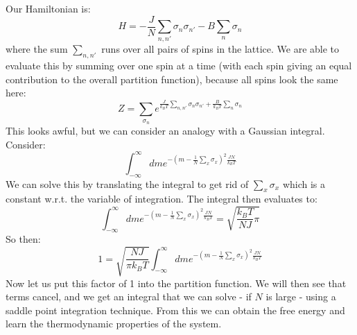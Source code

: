 Our Hamiltonian is:
\begin{equation}
    H = -\frac{J}{N}\sum_{n, n'}\sigma_n \sigma_{n'} - B\sum_n \sigma_n
\end{equation}
where the sum $\sum_{n, n'}$ runs over all pairs of spins in the lattice. We are able to evaluate this by summing over one spin at a time (with each spin giving an equal contribution to the overall partition function), because all spins look the same here:
\begin{equation}
    Z = \sum_{\sigma_n} e^{\frac{J}{k_B T}\sum_{n, n'}\sigma_n \sigma_{n'} + \frac{B}{k_B T}\sum_n \sigma_n}
\end{equation}
This looks awful, but we can consider an analogy with a Gaussian integral. Consider:
\begin{equation}
    \int_{-\infty}^\infty dm e^{-\left(m - \frac{1}{N}\sum_x \sigma_x\right)^2\frac{JN}{k_B T}}
\end{equation}
We can solve this by translating the integral to get rid of $\sum_x \sigma_x$ which is a constant w.r.t. the variable of integration. The integral then evaluates to:
\begin{equation}
    \int_{-\infty}^\infty dm e^{-\left(m - \frac{1}{N}\sum_x \sigma_x\right)^2\frac{JN}{k_B T}} = \sqrt{\frac{k_B T}{NJ}\pi}
\end{equation}
So then:
\begin{equation}
    1 = \sqrt{\frac{NJ}{\pi k_B T}}\int_{-\infty}^\infty dm e^{-\left(m - \frac{1}{N}\sum_x \sigma_x\right)^2\frac{JN}{k_B T}}
\end{equation}
Now let us put this factor of 1 into the partition function. We will then see that terms cancel, and we get an integral that we can solve - if $N$ is large - using a saddle point integration technique. From this we can obtain the free energy and learn the thermodynamic properties of the system.